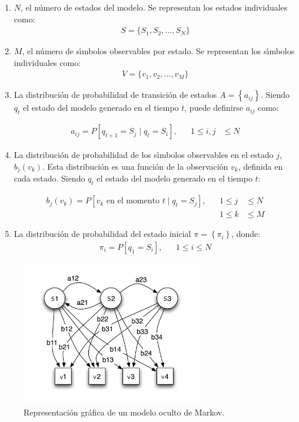 \begin{enumerate}
	\item $N$, el n\'umero de estados del modelo. Se representan los estados individuales como: 
		\begin{align}
			S=\{S_1,S_2,\ldots,S_N\}\label{eq:hmmS}
	\end{align}

	\item $M$, el n\'umero de s{\'\i}mbolos observables por estado. Se representan los s{\'\i}mbolos individuales 
		como: 
		\begin{align}
			V=\{v_1,v_2,\ldots,v_M\}\label{eq:hmmV}
	\end{align}

	\item La distribuci\'on de probabilidad de transici\'on de estados $A = \left\{a_{ij}\right\}$.
		Siendo $q_t$ el estado del modelo generado en el tiempo $t$, puede definirse $a_{ij}$ como:

		\begin{align}
			a_{ij} = P[q_{t+1} = S_j \mid q_t = S_i], & & 1 \leq i,j & \leq N\label{eq:hmmA}
		\end{align}

	\item La distribuci\'on de probabilidad de los s{\'\i}mbolos observables en el estado $j$, $b_j(v_k)$. 
		Esta distribuci\'on es una funci\'on de la observaci\'on $v_k$, definida en cada estado.
		Siendo $q_t$ el estado del modelo generado en el tiempo $t$:

		\begin{align}
			b_j(v_k) = P[v_k \text{ en el momento } t \mid q_t = S_j], & & 1 \leq j & \leq N \label{eq:hmmB}
			\\& & 1 \leq k & \leq M \nonumber
		\end{align}

	\item La distribuci\'on de probabilidad del estado inicial $\pi=\left\{\pi_i\right\}$, donde:
		\begin{align}
			\pi_i = P[q_1=S_i], & & 1 \leq i \leq N \label{eq:hmmPI}
		\end{align}
\end{enumerate}

\begin{figure}[H] 
\centering
\includegraphics[width=0.7\textwidth]{./graphics/hmm.png}
\caption{Representaci\'on gr\'afica de un modelo oculto de Markov.}
\label{figure:hmm}
\end{figure}
